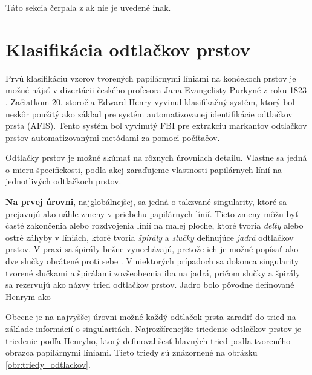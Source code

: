   Táto sekcia čerpala z \cite{Handbook} ak nie je uvedené inak.

  \section{Klasifikácia odtlačkov prstov} \label{sec:klasifikacia_odtl}
  Prvú klasifikáciu vzorov tvorených papilárnymi líniami na končekoch prstov je možné nájsť v dizertácii českého profesora Jana Evangelisty Purkyně
  z roku 1823 \cite{FingerprintSrcBook}. Začiatkom 20. storočia Edward Henry vyvinul klasifikačný systém, ktorý bol neskôr použitý ako základ pre systém
  automatizovanej identifikácie odtlačkov prsta (AFIS). Tento systém bol vyvinutý FBI pre extrakciu markantov odtlačkov prstov automatizovanými metódami
  za pomoci počítačov.

  Odtlačky prstov je možné skúmať na rôznych úrovniach detailu. Vlastne sa jedná o mieru špecifickosti, podľa akej zaraďujeme vlastnosti
  papilárnych línií na jednotlivých odtlačkoch prstov.

  \textbf{Na prvej úrovni}, najglobálnejšej, sa jedná o takzvané singularity, ktoré sa prejavujú ako náhle zmeny v priebehu papilárnych línií. Tieto 
  zmeny môžu byť časté zakončenia alebo rozdvojenia línií na malej ploche, ktoré tvoria \emph{delty} alebo ostré záhyby v líniách, 
  ktoré tvoria \emph{špirály} a \emph{slučky} definujúce \emph{jadrá} odtlačkov prstov. V praxi sa špirály bežne vynechávajú, pretože ich je možné popísať
  ako dve slučky obrátené proti sebe \cite{Handbook}. V niektorých prípadoch \cite{Drahansky, FingerprintSrcBook} sa dokonca singularity tvorené slučkami
  a špirálami zovšeobecnia iba na jadrá, pričom slučky a špirály sa rezervujú ako názvy tried odtlačkov prstov. Jadro bolo pôvodne definované Henrym \cite{Henry}
  ako 

  Obecne je na najvyššej úrovni možné každý odtlačok prsta zaradiť do tried na základe informácií o singularitách. Najrozšírenejšie triedenie odtlačkov
  prstov je triedenie podľa Henryho, ktorý definoval šesť hlavných tried podľa tvoreného obrazca papilárnymi líniami. Tieto triedy sú znázornené
  na obrázku \ref{obr:triedy_odtlackov}.

